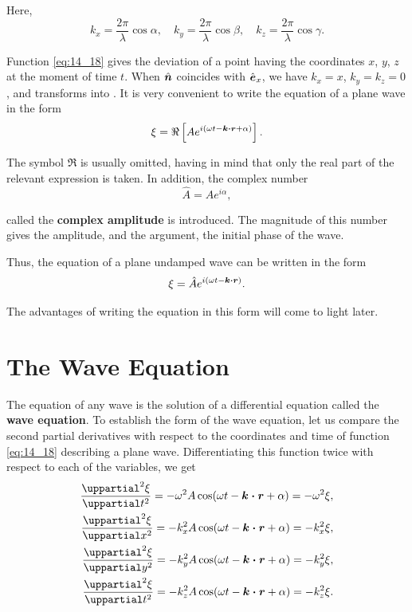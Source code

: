 \noindent
Here,
\begin{equation}\label{eq:14_19}
    k_x = \frac{2\pi}{\lambda}\cos\alpha,\quad k_y = \frac{2\pi}{\lambda}\cos\beta, \quad k_z = \frac{2\pi}{\lambda}\cos\gamma.
\end{equation}

\noindent
Function \eqref{eq:14_18} gives the deviation of a point having the coordinates $x$, $y$, $z$ at the moment of time $t$.
When $\hat{\boldsymbol{n}}$ coincides with $\hat{\boldsymbol{e}}_{x}$, we have $k_x = x$, $k_y = k_z = 0$, and  transforms into .
It is very convenient to write the equation of a plane wave in the form
\begin{equation}\label{eq:14_20}
    \xi = \Re\left[ A e^{i(\omega t - \boldsymbol{k}\boldsymbol{\cdot}\boldsymbol{r} + \alpha)} \right].
\end{equation}

\noindent
The symbol $\Re$ is usually omitted, having in mind that only the real part of the relevant expression is taken.
In addition, the complex number
\begin{equation}\label{eq:14_21}
    \hat{A} = A e^{i\alpha},
\end{equation}

\noindent
called the \textbf{complex amplitude} is introduced.
The magnitude of this number gives the amplitude, and the argument, the initial phase of the wave.

Thus, the equation of a plane undamped wave can be written in the form
\begin{equation}\label{eq:14_22}
    \xi = \hat{A} e^{i(\omega t - \boldsymbol{k}\boldsymbol{\cdot}\boldsymbol{r})}.
\end{equation}

\noindent
The advantages of writing the equation in this form will come to light later.

\section{The Wave Equation}\label{sec:14_4}

The equation of any wave is the solution of a differential equation called the \textbf{wave equation}.
To establish the form of the wave equation, let us compare the second partial derivatives with respect to the coordinates and time of function \eqref{eq:14_18} describing a plane wave.
Differentiating this function twice with respect to each of the variables, we get
\begin{align*}
    \diffnpartial{\xi}{t}{2} = -\omega^2 A \cos(\omega t - \vecdot{k}{r} + \alpha) = -\omega^2 \xi,\\
    \diffnpartial{\xi}{x}{2} = -k_x^2 A \cos(\omega t - \vecdot{k}{r} + \alpha) = -k_x^2 \xi,\\
    \diffnpartial{\xi}{y}{2} = -k_y^2 A \cos(\omega t - \vecdot{k}{r} + \alpha) = -k_y^2 \xi,\\
    \diffnpartial{\xi}{t}{2} = -k_z^2 A \cos(\omega t - \vecdot{k}{r} + \alpha) = -k_z^2 \xi.
\end{align*}

